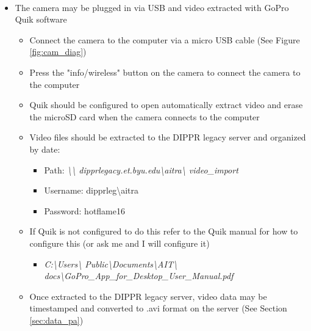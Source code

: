 \documentclass[letterpaper,11pt]{article}
\begin{document}
\begin{itemize}
    \item The camera may be plugged in via USB and video extracted with
        GoPro\textsuperscript{\textcopyright} Quik software
        \begin{itemize}
        \item Connect the camera to the computer via a micro USB cable (See 
            Figure \ref{fig:cam_diag})
        \item Press the "info/wireless" button on the camera to connect the 
            camera to the computer
        \item Quik should be configured to open automatically extract video and 
            erase the microSD card when the camera connects to the computer
        \item Video files should be extracted to the DIPPR legacy server and 
            organized by date:
            \begin{itemize}
            \item Path: \textit{\textbackslash \textbackslash 
               dipprlegacy.et.byu.edu\textbackslash aitra\textbackslash 
               video\_import}
            \item Username: dipprleg\textbackslash aitra
            \item Password: hotflame16
            \end{itemize}
        \item If Quik is not configured to do this refer to the Quik manual for
            how to configure this (or ask me and I will configure it)
            \begin{itemize}
            \item \textit{C:\textbackslash Users\textbackslash 
            Public\textbackslash Documents\textbackslash AIT\textbackslash 
            docs\textbackslash GoPro\_App\_for\_Desktop\_User\_Manual.pdf}
            \end{itemize}
        \item Once extracted to the DIPPR legacy server, video data may be 
            timestamped and converted to .avi format on the server (See 
            Section \ref{sec:data_pa})
        \end{itemize}
        

\end{itemize}
\end{document}
